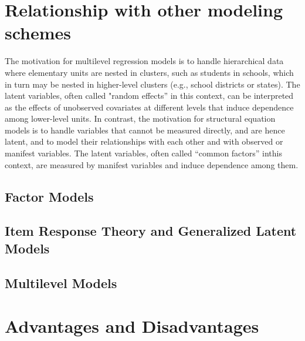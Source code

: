 \section{Relationship with other modeling schemes}

\citet{Rabe_et_al_2012}

{\color{red} The motivation for multilevel regression models is to handle hierarchical data where elementary units are nested in clusters, such as students in schools, which in
turn may be nested in higher-level clusters (e.g., school districts or states). The latent variables, often called "random effects” in this context, can be interpreted as
the effects of unobserved covariates at different levels that induce dependence among lower-level units. In contrast, the motivation for structural equation models is to
handle variables that cannot be measured directly, and are hence latent, and to model their relationships with each other and with observed or manifest variables.
The latent variables, often called “common factors” inthis context, are measured by manifest variables and induce dependence among them.}


\subsection{Factor Models}

\subsection{Item Response Theory and Generalized Latent Models}

\subsection{Multilevel Models}



\section{Advantages and Disadvantages}